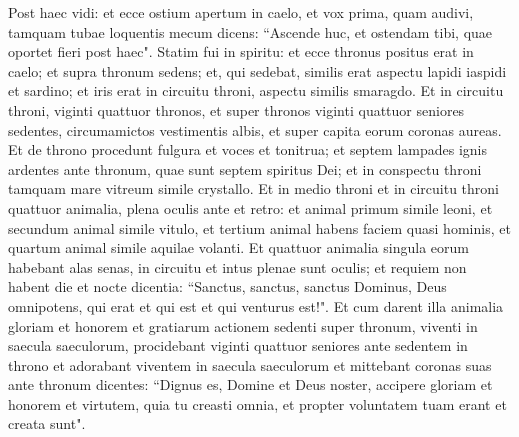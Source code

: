 \begin{biblechapter}  
\verse Post haec vidi: et ecce ostium apertum in caelo, et vox prima, quam audivi, tamquam tubae loquentis mecum dicens: “Ascende huc, et ostendam tibi, quae oportet fieri post haec". 
\verse Statim fui in spiritu: et ecce thronus positus erat in caelo; et supra thronum sedens; 
\verse et, qui sedebat, similis erat aspectu lapidi iaspidi et sardino; et iris erat in circuitu throni, aspectu similis smaragdo. 
\verse Et in circuitu throni, viginti quattuor thronos, et super thronos viginti quattuor seniores sedentes, circumamictos vestimentis albis, et super capita eorum coronas aureas. 
\verse Et de throno procedunt fulgura et voces et tonitrua; et septem lampades ignis ardentes ante thronum, quae sunt septem spiritus Dei; 
\verse et in conspectu throni tamquam mare vitreum simile crystallo. Et in medio throni et in circuitu throni quattuor animalia, plena oculis ante et retro: 
\verse et animal primum simile leoni, et secundum animal simile vitulo, et tertium animal habens faciem quasi hominis, et quartum animal simile aquilae volanti. 
\verse Et quattuor animalia singula eorum habebant alas senas, in circuitu et intus plenae sunt oculis; et requiem non habent die et nocte dicentia: “Sanctus, sanctus, sanctus Dominus, Deus omnipotens, qui erat et qui est et qui venturus est!". 
\verse Et cum darent illa animalia gloriam et honorem et gratiarum actionem sedenti super thronum, viventi in saecula saeculorum, 
\verse procidebant viginti quattuor seniores ante sedentem in throno et adorabant viventem in saecula saeculorum et mittebant coronas suas ante thronum dicentes: 
\verse “Dignus es, Domine et Deus noster, accipere gloriam et honorem et virtutem, quia tu creasti omnia, et propter voluntatem tuam erant et creata sunt". 
\end{biblechapter}

